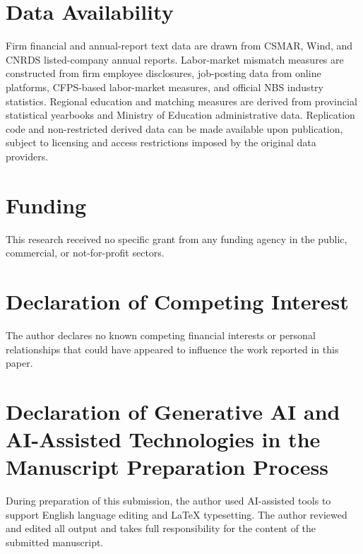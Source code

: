 \documentclass[12pt,a4paper]{article}
\theoremstyle{predstyle}
\theoremstyle{plain}
\begin{document}
\section*{Data Availability}

Firm financial and annual-report text data are drawn from CSMAR, Wind, and CNRDS listed-company annual reports. Labor-market mismatch measures are constructed from firm employee disclosures, job-posting data from online platforms, CFPS-based labor-market measures, and official NBS industry statistics. Regional education and matching measures are derived from provincial statistical yearbooks and Ministry of Education administrative data. Replication code and non-restricted derived data can be made available upon publication, subject to licensing and access restrictions imposed by the original data providers.

\section*{Funding}

This research received no specific grant from any funding agency in the public, commercial, or not-for-profit sectors.

\section*{Declaration of Competing Interest}

The author declares no known competing financial interests or personal relationships that could have appeared to influence the work reported in this paper.

\section*{Declaration of Generative AI and AI-Assisted Technologies in the Manuscript Preparation Process}

During preparation of this submission, the author used AI-assisted tools to support English language editing and \LaTeX{} typesetting. The author reviewed and edited all output and takes full responsibility for the content of the submitted manuscript.
\end{document}
